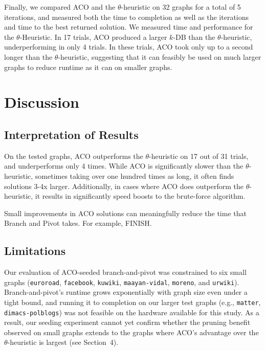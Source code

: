 \documentclass{article}
\begin{document}
Finally, we compared ACO and the $\theta$-heuristic on 32 graphs for a total of 5 iterations, and measured both the time to completion as well as the iterations and time to the best returned solution.
We measured time and performance for the $\theta$-Heuristic. In 17 trials, ACO produced a larger $k$-DB than the $\theta$-heuristic, underperforming in only 4 trials.
In these trials, ACO took only up to a second longer than the $\theta$-heuristic, suggesting that it can feasibly be used on much larger graphs to reduce runtime as it can on smaller graphs.

\section{Discussion}

\subsection{Interpretation of Results}

On the tested graphs, ACO outperforms the $\theta$-heuristic on 17 out of 31 trials, and underperforms only 4 times. While ACO is significantly slower than the $\theta$-heuristic, sometimes taking over one hundred times as long,
it often finds solutions 3-4x larger. Additionally, in cases where ACO does outperform the $\theta$-heuristic, it results in significantly speed boosts to the brute-force algorithm.

Small improvements in ACO solutions can meaningfully reduce the time that Branch and Pivot takes. For example, FINISH.

\subsection{Limitations}

Our evaluation of ACO-seeded branch-and-pivot was constrained to six small graphs (\texttt{euroroad}, \texttt{facebook}, \texttt{kuwiki}, \texttt{maayan-vidal}, \texttt{moreno}, and \texttt{urwiki}). Branch-and-pivot's runtime grows exponentially with graph size even under a tight bound, and running it to completion on our larger test graphs (e.g., \texttt{matter}, \texttt{dimacs-polblogs}) was not feasible on the hardware available for this study. As a result, our seeding experiment cannot yet confirm whether the pruning benefit observed on small graphs extends to the graphs where ACO's advantage over the $\theta$-heuristic is largest (see Section~4).
\end{document}
